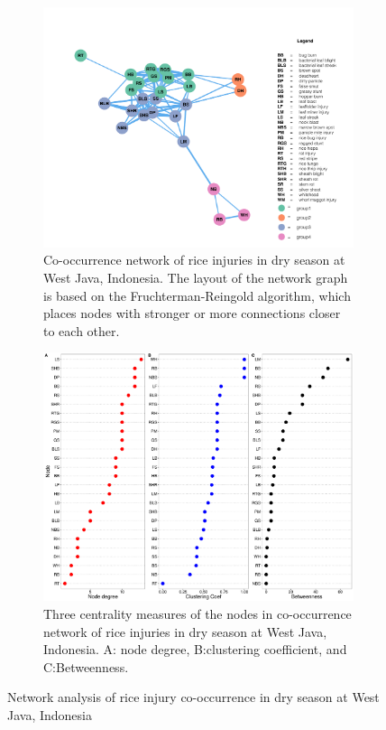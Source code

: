 \begin{figure}
    \centering
    \begin{subfigure}[b]{1\textwidth}
        \includegraphics[width = 1\textwidth]{figures/networkWJ_ds/networkWJ_ds.pdf}
        \caption{Co-occurrence network of rice injuries in dry season at West Java, Indonesia. The layout of the network graph is based on the Fruchterman-Reingold algorithm, which places nodes with stronger or more connections closer to each other.}
        \label{fig:networkWJ_ds}
    \end{subfigure}
    \begin{subfigure}[b]{1\textwidth}
        \includegraphics[width = 1\textwidth]{figures/nodepropWJ_ds/nodepropWJ_ds.pdf}
        \caption{Three centrality measures of the nodes in co-occurrence network of rice injuries in dry season at West Java, Indonesia. A: node degree, B:clustering coefficient, and C:Betweenness.}
        \label{fig:nodepropWJ_ds}
    \end{subfigure}
    \caption{Network analysis of rice injury co-occurrence in dry season at West Java, Indonesia}
    \label{fig:WJ_ds}
\end{figure}

